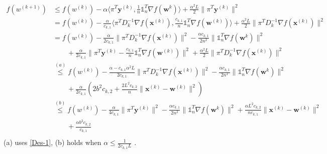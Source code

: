 \documentclass[10pt]{article}
\newcommand{\vw}{{\mathbf{w}}}
\newcommand{\vx}{{\mathbf{x}}}
\newcommand{\vy}{{\mathbf{y}}}
\begin{document}
\begin{align}\label{Des-2}
    f(w^{(k+1)})&\le f(w^{(k)})-\alpha \langle\pi^T\vy^{(k)},\frac{1}{n}\mathds{1}_n^T\nabla f(\vw^{k})\rangle +\frac{\alpha^2L}{2}\|\pi^T\vy^{(k)}\|^2 \nonumber \\
    &= f(w^{(k)})-\frac{\alpha}{c_{k,1}} \langle\pi^TD_k^{-1}\nabla f(\vx^{(k)}),\frac{c_{k,1}}{n}\mathds{1}_n^T\nabla f(\vw^{(k)})\rangle +\frac{\alpha^2L}{2}\|\pi^TD_k^{-1}\nabla f(\vx^{(k)})\|^2 \nonumber\\
    &=f(w^{(k)})-\frac{\alpha}{2c_{k,1}}\|\pi^TD_k^{-1}\nabla f(\vx^{(k)})\|^2-\frac{\alpha c_{k,1}}{2n^2}\|\mathds{1}_n^T\nabla f(\vw^{k})\|^2\nonumber\\
    &\qquad+\frac{\alpha}{2c_{k,1}} \|\pi^T\vy^{(k)}-\frac{c_{k,1}}{n}\mathds{1}_n^T\nabla f(\vw^{(k)})\|^2+\frac{\alpha^2L}{2}\|\pi^TD_k^{-1}\nabla f(\vx^{(k)})\|^2 \nonumber\\
    &\overset{(a)}{\le} f(w^{(k)})-\frac{\alpha-c_{k,1}\alpha^2L}{2c_{k,1}}\|\pi^TD_k^{-1}\nabla f(\vx^{(k)})\|^2-\frac{\alpha c_{k,1}}{2n^2}\|\mathds{1}_n^T\nabla f(\vw^{k})\|^2\nonumber\\
    &\qquad +\frac{\alpha}{2c_{k,1}}(2b^2c_{k,2}+\frac{2L^2c_{k,2}}{n}\|\vx^{(k)}-\vw^{(k)}\|^2) \nonumber\\
    &\overset{(b)}{\le} f(w^{(k)})-\frac{\alpha}{4c_{k,1}}\|\pi^T\vy^{(k)}\|^2-\frac{\alpha c_{k,1}}{2n^2}\|\mathds{1}_n^T\nabla f(\vw^{k})\|^2+\frac{\alpha L^2c_{k,2}}{nc_{k,1}}\|\vx^{(k)}-\vw^{(k)}\|^2\nonumber\\
    &\qquad +\frac{\alpha b^2c_{k,2}}{c_{k,1}} \nonumber\\
\end{align}
(a) uses \eqref{Des-1}, (b) holds when $\alpha \leq \frac{1}{2c_{k,1}L}$ .
\end{document}
